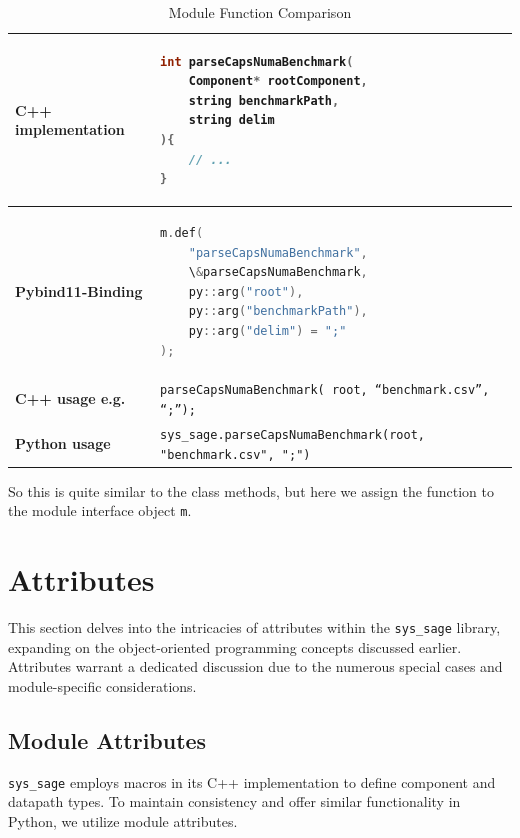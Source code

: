 \begin{table}[htbp]
\centering
\begin{tabular}{|l|l|}
\hline
\textbf{C++ implementation} &
\begin{lstlisting}[language=C++]
int parseCapsNumaBenchmark(
    Component* rootComponent,
    string benchmarkPath,
    string delim
){
    // ...
}
\end{lstlisting}
\\ \hline
\textbf{Pybind11-Binding} &
\begin{lstlisting}[language=C++]
m.def(
    "parseCapsNumaBenchmark",
    \&parseCapsNumaBenchmark,
    py::arg("root"),
    py::arg("benchmarkPath"),
    py::arg("delim") = ";"
);
\end{lstlisting}
\\ \hline
\textbf{C++ usage e.g.} &
\verb|parseCapsNumaBenchmark( root, “benchmark.csv”, “;”);| \\ \hline
\textbf{Python usage} &
\verb|sys_sage.parseCapsNumaBenchmark(root, "benchmark.csv", ";")| \\ \hline
\end{tabular}
\caption{Module Function Comparison}
\label{tab:module_functions}
\end{table}

So this is quite similar to the class methods, but here we assign the function to the module interface object \verb|m|.
\newpage


\section{Attributes}

This section delves into the intricacies of attributes within the \verb|sys_sage| library, expanding on the object-oriented programming concepts discussed earlier. Attributes warrant a dedicated discussion due to the numerous special cases and module-specific considerations.

\subsection{Module Attributes}

\verb|sys_sage| employs macros in its C++ implementation to define component and datapath types. To maintain consistency and offer similar functionality in Python, we utilize module attributes. 

